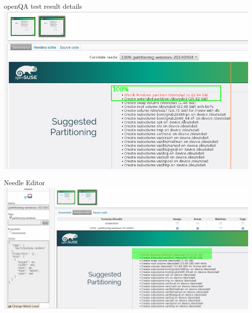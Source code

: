 \documentclass[
]{beamer}
\begin{document}
\begin{frame}{openQA test result details }
  \includegraphics[width=.8\paperwidth]{openqa-match.png}
\end{frame}


\begin{frame}{Needle Editor}
  \includegraphics[width=.8\paperwidth]{openqa-needle-editor.png}
\end{frame}
\end{document}
